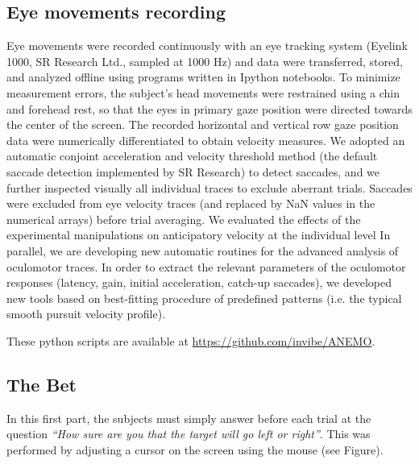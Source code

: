 \documentclass[12pt,english]{article}%
\begin{document}
\subsection{Eye movements recording}
Eye movements were recorded continuously with an eye tracking system (Eyelink 1000, SR Research Ltd., sampled at 1000 Hz) and data were transferred, stored, and analyzed offline using programs written in Ipython notebooks.
To minimize measurement errors, the subject's head movements were restrained using a chin and forehead rest, so that the eyes in primary gaze position were directed towards the center of the screen. The recorded horizontal and vertical row gaze position data were numerically differentiated to obtain velocity measures. We adopted an automatic conjoint acceleration and velocity threshold method (the default saccade detection implemented by SR Research) to detect saccades, and we further inspected visually all individual traces to exclude aberrant trials. Saccades were excluded from eye velocity traces (and replaced by NaN values in the numerical arrays) before trial averaging. We evaluated the effects of the experimental manipulations on anticipatory velocity at the individual level
%
In parallel, we are developing new automatic routines for the advanced analysis of oculomotor traces. In order to extract the relevant parameters of the oculomotor responses (latency, gain, initial acceleration, catch-up saccades), we developed new tools based on best-fitting procedure of predefined patterns (i.e. the typical smooth pursuit velocity profile).

These python scripts are available at \url{https://github.com/invibe/ANEMO}.

\subsection{The Bet}
In this first part, the subjects must simply answer before each trial at the question \textit{ ``How sure are you that the target will go left or right''}. This was performed by adjusting a cursor on the screen using the mouse (see Figure).

\end{document}
